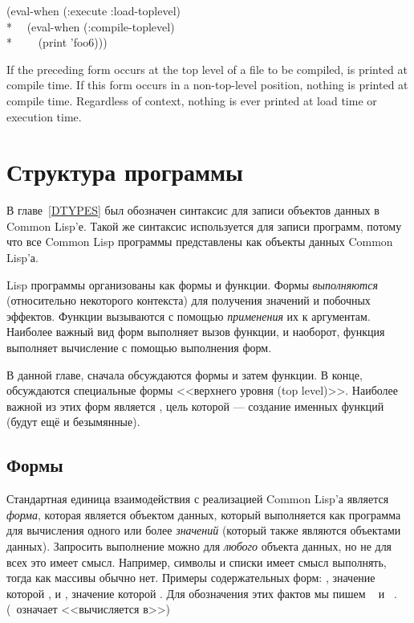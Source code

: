 \begin{newer}
\begin{defspec}
\begin{lisp}
(eval-when (:execute :load-toplevel) \\*
~~(eval-when (:compile-toplevel) \\*
~~~~(print 'foo6)))
\end{lisp}

    If the preceding form occurs at the top level of a file to be compiled,
        is
       printed at compile time.  If this form occurs in a non-top-level
       position, nothing is printed at compile time. Regardless of context,
       nothing is ever printed at load time or execution time.
\end{defspec}
\end{newer}

\else

\chapter{Структура программы}
\label{PROGS}

В главе~\ref{DTYPES} был обозначен синтаксис для записи объектов данных в Common
Lisp'е. Такой же синтаксис используется для записи программ, потому что все
Common Lisp программы представлены как объекты данных Common Lisp'а.

Lisp программы организованы как формы и функции. Формы \emph{выполняются}
(относительно некоторого контекста) для получения значений и побочных
эффектов. Функции вызываются с помощью \emph{применения} их к аргументам.
Наиболее важный вид форм выполняет вызов функции, и наоборот, функция выполняет
вычисление с помощью выполнения форм.

В данной главе, сначала обсуждаются формы и затем функции. В конце, обсуждаются
специальные формы <<верхнего уровня (top level)>>. Наиболее важной из этих форм
является , цель которой --- создание именных функций (будут
ещё и безымянные).

\section{Формы}

Стандартная единица взаимодействия с реализацией Common Lisp'а является
\emph{форма}, которая является объектом данных, который выполняется как
программа для вычисления одного или более \emph{значений} (который также
являются объектами данных). Запросить выполнение можно для \emph{любого}
объекта данных, но не для всех это имеет смысл. Например, символы и списки имеет
смысл выполнять, тогда как массивы обычно нет. Примеры содержательных форм:
, значение которой , и , значение которой .
Для обозначения этих фактов мы пишем  \EV\  и  \EV\
. (\EV\ означает <<вычисляется в>>)

